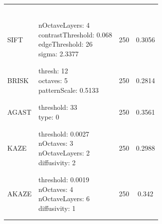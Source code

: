 \documentclass[journal]{IEEEtran}
\begin{document}
\begin{table}
{\begin{minipage}{0.47\textwidth}
\begin{tabular}{lp{3cm}cc}
    & & \\
    & & \\
    & & \\
    & & \\
    & & \\
    & & \\
    \multirow{4}{*}{SIFT} & \multirow{4}{*}{\parbox{3.25cm}{\raggedright nOctaveLayers: 4\\contrastThreshold: 0.068\\edgeThreshold: 26\\sigma: 2.3377}} & \multirow{4}{*}{250}  & \multirow{4}{*}{0.3056} \\
    & & \\
    & & \\
    & & \\
    & & \\
    & & \\
    \multirow{3}{*}{BRISK} & \multirow{3}{*}{\parbox{3.25cm}{\raggedright thresh: 12\\octaves: 5\\patternScale: 0.5133}} & \multirow{3}{*}{250}  & \multirow{3}{*}{0.2814} \\
    & & \\
    & & \\
    & & \\
    & & \\
    \multirow{2}{*}{AGAST} & \multirow{2}{*}{\parbox{3.25cm}{\raggedright threshold: 33\\type: 0}} & \multirow{2}{*}{250}  & \multirow{2}{*}{0.3561} \\
    & & \\
    & & \\
    & & \\
    \multirow{4}{*}{KAZE} & \multirow{4}{*}{\parbox{3.25cm}{\raggedright threshold: 0.0027\\nOctaves: 3\\nOctaveLayers: 2\\diffusivity: 2}} & \multirow{4}{*}{250}  & \multirow{4}{*}{0.2988} \\
    & & \\
    & & \\
    & & \\
    & & \\
    & & \\
    \multirow{4}{*}{AKAZE} & \multirow{4}{*}{\parbox{3.25cm}{\raggedright threshold: 0.0019\\nOctaves: 4\\nOctaveLayers: 6\\diffusivity: 1}} & \multirow{4}{*}{250}  & \multirow{4}{*}{0.342} \\
    & & \\
    & & \\
    & & \\
    & & \\
    & & \\
    \bottomrule
    \end{tabular}
\end{minipage}
}
\end{table}
\end{document}
